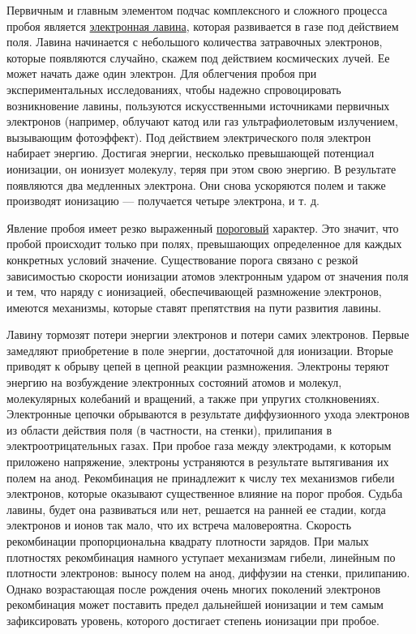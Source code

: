\documentclass[10pt, a4paper]{article}
\begin{document}
Первичным и главным элементом подчас комплексного и сложного процесса пробоя является \uline{электронная лавина}, которая развивается в газе под действием поля. Лавина начинается с небольшого количества затравочных электронов, которые появляются случайно, скажем под действием космических лучей. Ее может начать даже один электрон. Для облегчения пробоя при экспериментальных исследованиях, чтобы надежно спровоцировать возникновение лавины, пользуются искусственными источниками первичных электронов (например, облучают катод или газ ультрафиолетовым излучением, вызывающим фотоэффект). Под действием электрического поля электрон набирает энергию. Достигая энергии, несколько превышающей потенциал ионизации, он ионизует молекулу, теряя при этом свою энергию. В результате появляются два медленных электрона. Они снова ускоряются полем и также производят ионизацию — получается четыре электрона, и т. д.

Явление пробоя имеет резко выраженный \uline{пороговый} характер. Это значит, что пробой происходит только при полях, превышающих определенное для каждых конкретных условий значение. Существование порога связано с резкой зависимостью скорости ионизации атомов электронным ударом от значения поля и тем, что наряду с ионизацией, обеспечивающей размножение электронов, имеются механизмы, которые ставят препятствия на пути развития лавины.

Лавину тормозят потери энергии электронов и потери самих электронов. Первые замедляют приобретение в поле энергии, достаточной для ионизации. Вторые приводят к обрыву цепей в цепной реакции размножения. Электроны теряют энергию на возбуждение электронных состояний атомов и молекул, молекулярных колебаний и вращений, а также при упругих столкновениях. Электронные цепочки обрываются в результате диффузионного ухода электронов из области действия поля (в частности, на стенки), прилипания в электроотрицательных газах. При пробое газа между электродами, к которым приложено напряжение, электроны устраняются в результате вытягивания их полем на анод. Рекомбинация не принадлежит к числу тех механизмов гибели электронов, которые оказывают существенное влияние на порог пробоя. Судьба лавины, будет она развиваться или нет, решается на ранней ее стадии, когда электронов и ионов так мало, что их встреча маловероятна. Скорость рекомбинации пропорциональна квадрату плотности зарядов. При малых плотностях рекомбинация намного уступает механизмам гибели, линейным по плотности электронов: выносу полем на анод, диффузии на стенки, прилипанию. Однако возрастающая после рождения очень многих поколений электронов рекомбинация может поставить предел дальнейшей ионизации и тем самым зафиксировать уровень, которого достигает степень ионизации при пробое.
\end{document}
